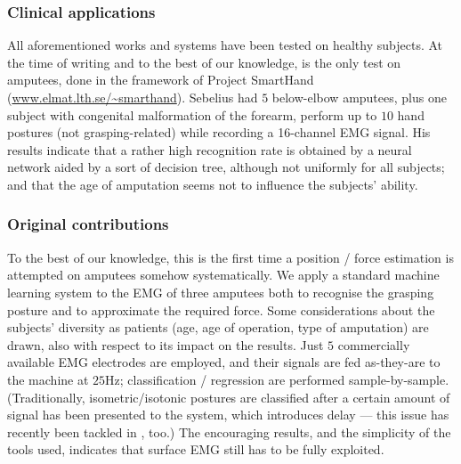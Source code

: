 \subsubsection{Clinical applications}

All aforementioned works and systems have been tested on healthy subjects. At the time
of writing and to the best of our knowledge, \cite{sebelius} is the only test on amputees, done
in the framework of Project SmartHand (\url{www.elmat.lth.se/~smarthand}).
Sebelius had $5$ below-elbow amputees, plus one subject
with congenital malformation of the forearm, perform up to
$10$ hand postures (not grasping-related) while recording a 16-channel EMG signal. His
results indicate that a rather high recognition rate is obtained by a neural network
aided by a sort of decision tree, although not uniformly for all subjects; and that
the age of amputation seems not to influence the subjects' ability.

\subsubsection{Original contributions}

To the best of our knowledge, this is the first time a position / force estimation
is attempted on amputees somehow systematically. We apply a standard machine learning
system to the EMG of three amputees both to recognise the grasping posture and
to approximate the required force. Some considerations about the subjects' diversity
as patients (age, age of operation, type of amputation) are drawn, also with respect to
its impact on the results. Just $5$ commercially available EMG electrodes are
employed, and their signals are fed as-they-are to the machine at $25$Hz;
classification / regression are performed sample-by-sample.
(Traditionally, isometric/isotonic postures are classified after a certain amount
of signal has been presented to the system, which introduces delay --- this issue
has recently been tackled in \cite{tsukamoto}, too.) The encouraging results,
and the simplicity of the tools used, indicates that surface EMG still has to be
fully exploited.
